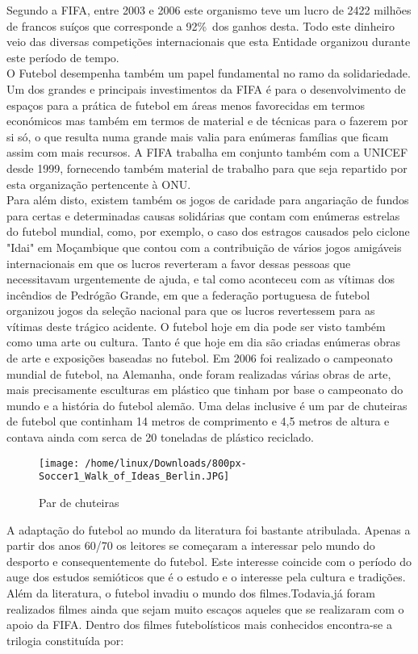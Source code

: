 \documentclass[a4paper,12pt]{report}
\begin{document}
Segundo a \ac{FIFA}, entre 2003 e 2006 este organismo teve um lucro de 2422 milhões de francos suíços que corresponde a 92\%\ dos ganhos desta. Todo este dinheiro veio das diversas competições internacionais que esta Entidade organizou durante este período de tempo. \\
O Futebol desempenha também um papel fundamental no ramo da solidariedade. Um dos grandes e principais investimentos da FIFA é para o desenvolvimento de espaços para a prática de futebol em áreas menos favorecidas em termos económicos mas também em termos de material e de técnicas para o fazerem por si só, o que resulta numa grande mais valia para enúmeras famílias que ficam assim com mais recursos. A FIFA trabalha em conjunto também com a UNICEF desde 1999, fornecendo também material de trabalho para que seja repartido por esta organização pertencente à ONU.\\ 
Para além disto, existem também os jogos de caridade para angariação de fundos para certas e determinadas causas solidárias que contam com enúmeras estrelas do futebol mundial, como, por exemplo, o caso dos estragos causados pelo ciclone "Idai" em Moçambique que contou com a contribuição de vários jogos amigáveis internacionais em que os lucros reverteram a favor dessas pessoas que necessitavam urgentemente de ajuda, e tal como aconteceu com as vítimas dos incêndios de Pedrógão Grande, em que a federação portuguesa de futebol organizou jogos da seleção nacional para que os lucros revertessem para as vítimas deste trágico acidente. 
\newpage
O futebol hoje em dia pode ser visto também como uma arte ou cultura. Tanto é que hoje em dia são criadas enúmeras obras de arte e exposições baseadas no futebol. Em 2006 foi realizado o campeonato mundial de futebol, na Alemanha, onde foram realizadas várias obras de arte, mais precisamente esculturas em plástico que tinham por base o campeonato do mundo e a história do futebol alemão. Uma delas inclusive é um par de chuteiras de futebol que continham 14 metros de comprimento e 4,5 metros de altura e contava ainda com serca de 20 toneladas de plástico reciclado. 

\begin{figure}[!htp]
\centering 
\texttt{[image: /home/linux/Downloads/800px-Soccer1\_Walk\_of\_Ideas\_Berlin.JPG]}
\caption{Par de chuteiras}
\end{figure}

A adaptação do futebol ao mundo da literatura foi bastante atribulada. Apenas a partir dos anos 60/70 os leitores se começaram a interessar pelo mundo do desporto e consequentemente do futebol. Este interesse coincide com o período do auge dos estudos semióticos que é o estudo e o interesse pela cultura e tradições. 
\newpage
Além da literatura, o futebol invadiu o mundo dos filmes.Todavia,já foram realizados filmes ainda que sejam muito escaços aqueles que se realizaram com o apoio da FIFA. Dentro dos filmes futebolísticos mais conhecidos encontra-se a trilogia constituída por: 
\end{document}
